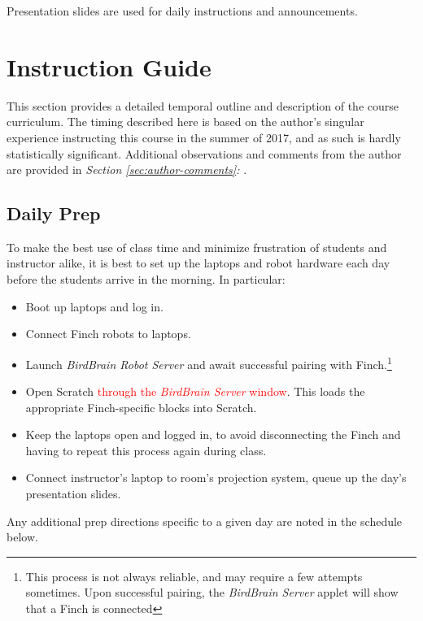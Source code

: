 \documentclass[a4paper]{article}
\begin{document}
		Presentation slides are used for daily instructions and announcements.

	\newpage
	
	\section{Instruction Guide}
	
	This section provides a detailed temporal outline and description of the course curriculum. The timing described here is based on the author's singular experience instructing this course in the summer of 2017, and as such is hardly statistically significant. Additional observations and comments from the author are provided in \emph{Section \ref{sec:author-comments}: }. 
	
	\subsection{Daily Prep}
	
		To make the best use of class time and minimize frustration of students and instructor alike, it is best to set up the laptops and robot hardware each day before the students arrive in the morning. In particular:
		
		\begin{itemize}
			\item Boot up laptops and log in.
			
			\item Connect Finch robots to laptops.
			
			\item Launch \emph{BirdBrain Robot Server} and await successful pairing with Finch.\footnote[1]{This process is not always reliable, and may require a few attempts sometimes. Upon successful pairing, the \emph{BirdBrain Server} applet will show that a Finch is connected}
			
			\item Open Scratch \textcolor{red}{through the \emph{BirdBrain Server} window}. This loads the appropriate Finch-specific blocks into Scratch.
			
			\item Keep the laptops open and logged in, to avoid disconnecting the Finch and having to repeat this process again during class.
			
			\item Connect instructor's laptop to room's projection system, queue up the day's presentation slides.
		\end{itemize}
		\vspace{1em}
		Any additional prep directions specific to a given day are noted in the schedule below.
	
\end{document}
